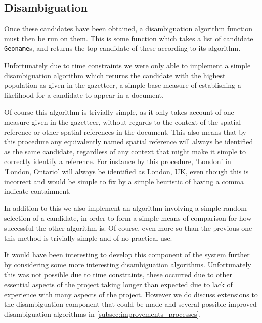 \documentclass[12pt, a4paper]{report}
\begin{document}

\subsection{Disambiguation}

Once these candidates have been obtained, a disambiguation algorithm function must then be run on them. This is some function which takes a list of candidate \verb#Geoname#s, and returns the top candidate of these according to its algorithm.

Unfortunately due to time constraints we were only able to implement a simple disambiguation algorithm which returns the candidate with the highest population as given in the gazetteer, a simple base measure of establishing a likelihood for a candidate to appear in a document.

Of course this algorithm is trivially simple, as it only takes account of one measure given in the gazetteer, without regards to the context of the spatial reference or other spatial references in the document. This also means that by this procedure any equivalently named spatial reference will always be identified as the same candidate, regardless of any context that might make it simple to correctly identify a reference. For instance by this procedure, 'London' in 'London, Ontario' will always be identified as London, UK, even though this is incorrect and would be simple to fix by a simple heuristic of having a comma indicate containment.

In addition to this we also implement an algorithm involving a simple random selection of a candidate, in order to form a simple means of comparison for how successful the other algorithm is. Of course, even more so than the previous one this method is trivially simple and of no practical use.

It would have been interesting to develop this component of the system further by considering some more interesting disambiguation algorithms. Unfortunately this was not possible due to time constraints, these occurred due to other essential aspects of the project taking longer than expected due to lack of experience with many aspects of the project. However we do discuss extensions to the disambiguation component that could be made and several possible improved disambiguation algorithms in \ref{subsec:improvements_processes}.
\end{document}
